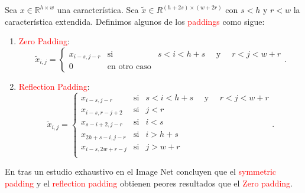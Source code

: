 \begin{definition}
    Sea $x\in \mathbb R^{h\times w}$ una característica. Sea $\tilde x \in R^{(h+2s)\times (w+2r)}$ con $s < h$ y $r < w$ la característica extendida. Definimos algunos de los \textcolor{red}{paddings} como sigue: 
    \begin{enumerate}
        \item \textcolor{red}{Zero Padding}: 
        \begin{equation}           
            \tilde x_{i,j} = \left\{ 
                \begin{matrix}
                    x_{i-s, j-r} & \text{si} & s< i <h+s \quad \text{ y } \quad r< j < w+r \\
                    0 & \text{en otro caso}
                \end{matrix}
            \right..
        \end{equation}
        \item \textcolor{red}{Reflection Padding}:
        \begin{equation}           
            \tilde x_{i,j} = \left\{ 
                \begin{matrix}
                    x_{i-s, j-r} & \text{si} & s< i <h+s \quad \text{ y } \quad r< j < w+r \\
                    x_{i-s, r-j+2} & \text{si} & j < r \\
                    x_{s-i+2, j-r} & \text{si} & i < s \\
                    x_{2h+s-i, j-r} & \text{si} & i > h+s \\
                    x_{i-s, 2w+r-j} & \text{si} & j > w+r \\
                \end{matrix}
            \right..
        \end{equation}
    \end{enumerate}  
\end{definition}
En \cite{type_of_paddings} tras un estudio exhaustivo en el Image Net concluyen que el \textcolor{red}{symmetric padding} y el \textcolor{red}{reflection padding} obtienen peores resultados que el \textcolor{red}{Zero padding}. 
